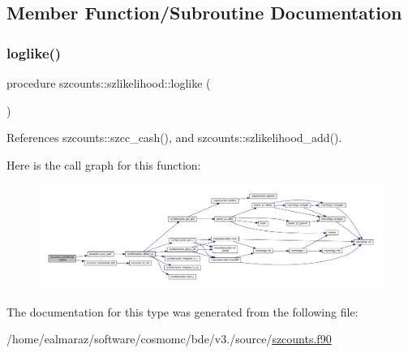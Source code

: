 \subsection{Member Function/\+Subroutine Documentation}
\mbox{\label{structszcounts_1_1szlikelihood_a665a08ba872cde55b79b81117d63c8d2}} 
\subsubsection{\texorpdfstring{loglike()}{loglike()}}
{\footnotesize\ttfamily procedure szcounts\+::szlikelihood\+::loglike (\begin{DoxyParamCaption}{ }\end{DoxyParamCaption})\hspace{0.3cm}{\ttfamily [private]}}



References szcounts\+::szcc\+\_\+cash(), and szcounts\+::szlikelihood\+\_\+add().

Here is the call graph for this function\+:
\nopagebreak
\begin{figure}[H]
\begin{center}
\leavevmode
\includegraphics[width=350pt]{structszcounts_1_1szlikelihood_a665a08ba872cde55b79b81117d63c8d2_cgraph}
\end{center}
\end{figure}


The documentation for this type was generated from the following file\+:\begin{DoxyCompactItemize}
\item 
/home/ealmaraz/software/cosmomc/bde/v3./source/\mbox{\hyperlink{szcounts_8f90}{szcounts.\+f90}}\end{DoxyCompactItemize}

